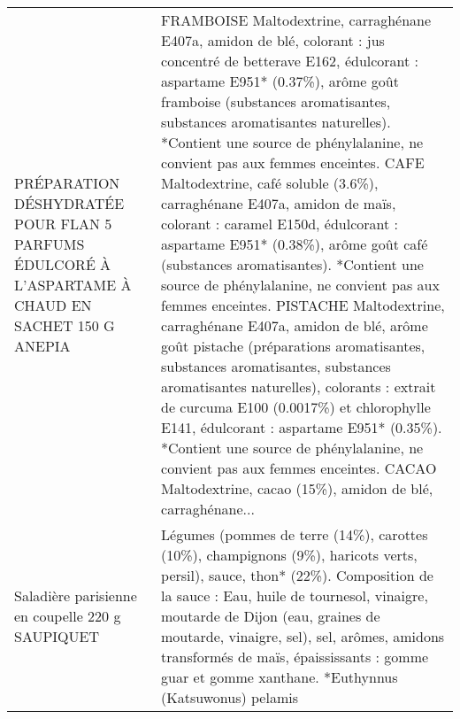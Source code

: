 \begin{longtable}{p{5cm}p{10cm}}
        PRÉPARATION DÉSHYDRATÉE POUR FLAN 5 PARFUMS ÉDULCORÉ À L'ASPARTAME À CHAUD EN SACHET 150 G ANEPIA &  FRAMBOISE  Maltodextrine, carraghénane E407a, amidon de blé, colorant : jus concentré de betterave E162, édulcorant : aspartame E951* (0.37\%), arôme goût framboise (substances aromatisantes, substances aromatisantes naturelles).   *Contient une source de phénylalanine, ne convient pas aux femmes enceintes.  CAFE  Maltodextrine, café soluble (3.6\%), carraghénane E407a, amidon de maïs, colorant : caramel E150d, édulcorant : aspartame E951* (0.38\%), arôme goût café (substances  aromatisantes).  *Contient une source de phénylalanine, ne convient pas aux femmes enceintes.  PISTACHE  Maltodextrine, carraghénane E407a, amidon de blé, arôme goût pistache (préparations aromatisantes, substances aromatisantes, substances aromatisantes naturelles),  colorants : extrait de curcuma E100 (0.0017\%) et chlorophylle E141, édulcorant : aspartame E951* (0.35\%).  *Contient une source de phénylalanine, ne convient pas aux femmes enceintes.  CACAO  Maltodextrine, cacao (15\%), amidon de blé, carraghénane... \\
                                                         Saladière parisienne en coupelle 220 g SAUPIQUET &                                                                                                                                                                                                                                                                                                                                                                                                                                                                                                                                                                                                                                                                       Légumes (pommes de terre (14\%), carottes (10\%), champignons (9\%), haricots verts, persil), sauce, thon* (22\%).  Composition de la sauce : Eau, huile de tournesol, vinaigre, moutarde de Dijon (eau, graines de moutarde, vinaigre, sel), sel, arômes, amidons transformés de maïs, épaississants : gomme guar et gomme xanthane.  *Euthynnus (Katsuwonus) pelamis \\

\end{longtable}

